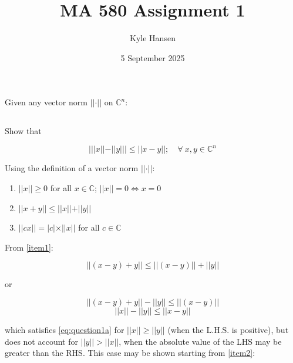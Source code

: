 \documentclass{template}
\title{MA 580 Assignment 1}
\author{Kyle Hansen}
\date{5 September 2025}
\begin{document}
\maketitle

\section{}

Given any vector norm $\vert \vert \cdot\vert \vert $ on $\mathbb{C}^n$:

\subsection{}

Show that

\begin{equation}\label{eq:question1a}
    \left\vert \vert \vert x\vert \vert  - \vert \vert y\vert \vert  \right\vert  \leq \vert \vert x-y\vert \vert ;\quad \forall \:  x,y \in \mathbb{C}^n
\end{equation}

Using the definition of a vector norm $\vert \vert \cdot\vert \vert $:

\begin{enumerate}[label=(\alph*)]
    \item\label{item1} $\vert \vert x\vert \vert  \geq 0$ for all $x\in \mathbb{C}$; $\vert \vert x\vert \vert =0 \iff x=0$
    \item\label{item2} $\vert \vert x+y\vert \vert  \leq \vert \vert x\vert \vert +\vert \vert y\vert \vert $
    \item\label{item3} $\vert\vert cx|| = \vert c\vert\times\vert\vert x\vert \vert$ for all $c\in \mathbb{C}$
\end{enumerate}

From \ref{item1}:

\begin{equation}\label{eq:firstcase}
    || (x-y)+y || \leq || (x-y)|| + || y ||
\end{equation}

or 

\begin{equation}
    || (x-y)+y || - || y || \leq || (x-y)|| 
\end{equation}
\begin{equation}
    || x || - || y || \leq || x-y|| 
\end{equation}

which satisfies \autoref{eq:question1a} for $||x|| \geq ||y||$ (when the L.H.S. is positive), but does not account for $||y|| > ||x||$, when the absolute value of the LHS may be greater than the RHS. This case may be shown starting from \ref{item2}:
\end{document}

